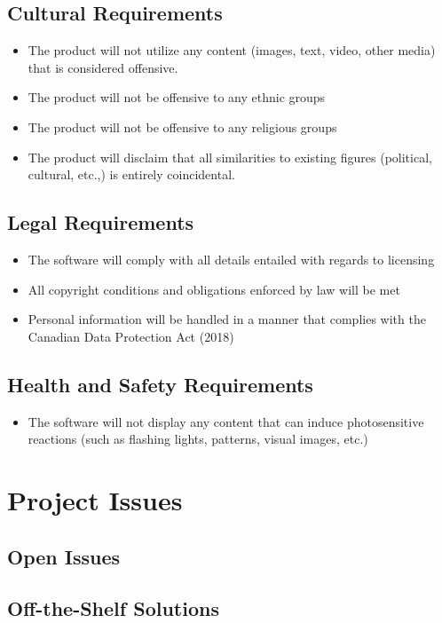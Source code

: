 \documentclass[12pt, titlepage]{article}
\begin{document}
\subsection{Cultural Requirements}
\begin{itemize}
\item The product will not utilize any content (images, text, video, other media) that is considered offensive.
\item The product will not be offensive to any ethnic groups
\item The product will not be offensive to any religious groups
\item The product will disclaim that all similarities to existing figures (political, cultural, etc.,) is entirely coincidental. 
\end{itemize}
\subsection{Legal Requirements}
\begin{itemize}
\item The software will comply with all details entailed with regards to licensing 
\item All copyright conditions and obligations enforced by law will be met 
\item Personal information will be handled in a manner that complies with the Canadian Data Protection Act (2018)
\end{itemize}
\subsection{Health and Safety Requirements}
\begin{itemize}
\item The software will not display any content that can induce photosensitive reactions (such as flashing lights, patterns, visual images, etc.)
\end{itemize}

\section{Project Issues}

\subsection{Open Issues}

\subsection{Off-the-Shelf Solutions}
\end{document}
